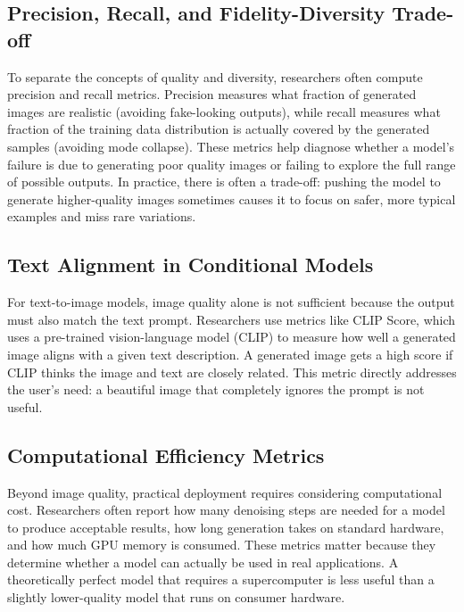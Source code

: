\documentclass[a4paper,12pt]{article}
\begin{document}
\subsection{Precision, Recall, and Fidelity-Diversity Trade-off}
To separate the concepts of quality and diversity, researchers often compute precision and recall metrics. Precision measures what fraction of generated images are realistic (avoiding fake-looking outputs), while recall measures what fraction of the training data distribution is actually covered by the generated samples (avoiding mode collapse). These metrics help diagnose whether a model's failure is due to generating poor quality images or failing to explore the full range of possible outputs. In practice, there is often a trade-off: pushing the model to generate higher-quality images sometimes causes it to focus on safer, more typical examples and miss rare variations.

\subsection{Text Alignment in Conditional Models}
For text-to-image models, image quality alone is not sufficient because the output must also match the text prompt. Researchers use metrics like CLIP Score, which uses a pre-trained vision-language model (CLIP) to measure how well a generated image aligns with a given text description. A generated image gets a high score if CLIP thinks the image and text are closely related. This metric directly addresses the user's need: a beautiful image that completely ignores the prompt is not useful.

\subsection{Computational Efficiency Metrics}
Beyond image quality, practical deployment requires considering computational cost. Researchers often report how many denoising steps are needed for a model to produce acceptable results, how long generation takes on standard hardware, and how much GPU memory is consumed. These metrics matter because they determine whether a model can actually be used in real applications. A theoretically perfect model that requires a supercomputer is less useful than a slightly lower-quality model that runs on consumer hardware.
\end{document}
